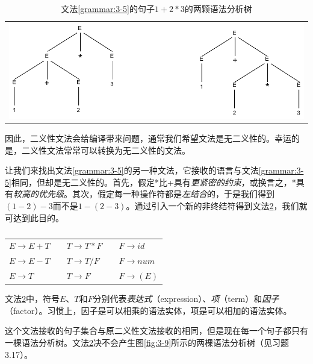 \documentclass[cn,11pt,chinese]{elegantbook}
\begin{document}
\renewcommand\tablename{图}
\begin{table}[htbp]
  \centering
  \begin{tabular}{l}
  \includegraphics[width=.8\textwidth]{3-7.pdf}
  \end{tabular}
  \caption{文法\ref{grammar:3-5}的句子$1+2*3$的两颗语法分析树}
  \label{fig:3-7}
\end{table}
\renewcommand\tablename{表}

因此，二义性文法会给编译带来问题，通常我们希望文法是无二义性的。幸运的是，二义性文法常常可以转换为无二义性的文法。

让我们来找出文法\ref{grammar:3-5}的另一种文法，它接收的语言与文法\ref{grammar:3-5}相同，但却是无二义性的。首先，假定*比+具有\textit{更紧密的约束}，或换言之，*具有\textit{较高的优先级}。其次，假定每一种操作符都是\textit{左结合}的，于是我们得到$(1-2)-3$而不是$1-(2-3)$。通过引入一个新的非终结符得到文法\ref{grammar:3-8}，我们就可达到此目的。

\renewcommand\tablename{文法}
\begin{table}[htbp]
  \centering
  \begin{tabular}{lllll}
    \toprule
    $E\rightarrow E+T$ & \quad & $T\rightarrow T*F$ & \quad & $F\rightarrow id$ \\
    $E\rightarrow E-T$ & \quad & $T\rightarrow T/F$ & \quad & $F\rightarrow num$ \\
    $E\rightarrow T$   & \quad & $T\rightarrow F$   & \quad & $F\rightarrow (E)$ \\
    \bottomrule
  \end{tabular}
  \caption{}
  \label{grammar:3-8}
\end{table}
\renewcommand\tablename{表}

文法\ref{grammar:3-8}中，符号$E$、$T$和$F$分别代表\textit{表达式}（expression）、\textit{项}（term）和\textit{因子}（factor）。习惯上，因子是可以相乘的语法实体，项是可以相加的语法实体。

这个文法接收的句子集合与原二义性文法接收的相同，但是现在每一个句子都只有一棵语法分析树。文法\ref{grammar:3-8}决不会产生图\ref{fig:3-9}所示的两棵语法分析树（见习题3.17）。
\end{document}
